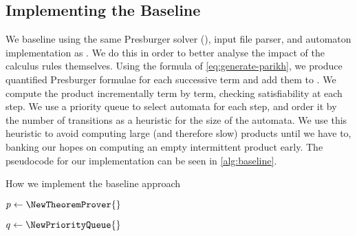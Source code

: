 \documentclass[acmsmall,review,anonymous,screen]{acmart}\settopmatter{printfolios=true,printccs=false,printacmref=true}
\theoremstyle{definition}
\begin{document}
\subsection{Implementing the Baseline}\label{sec:implementing-baseline}

We baseline using the same Presburger solver (\Princess{}), input file parser,
and automaton implementation as \Catra. We do this in order to better analyse
the impact of the calculus rules themselves. Using the formula of
\eqref{eq:generate-parikh}, we produce quantified Presburger formulae for each
successive term and add them to \Princess. We compute the product incrementally
term by term, checking satisfiability at each step. We use a priority queue to
select automata for each step, and order it by the number of transitions as a
heuristic for the size of the automata. We use this heuristic to avoid computing
large (and therefore slow) products until we have to, banking our hopes on
computing an empty intermittent product early. The pseudocode for our
implementation can be seen in \cref{alg:baseline}.

\begin{algorithm}
  \caption{How we implement the baseline approach}\label{alg:baseline}

  $p \gets \NewTheoremProver{}$



  $q \gets \NewPriorityQueue{}$


  

  \end{algorithm}
\end{document}
